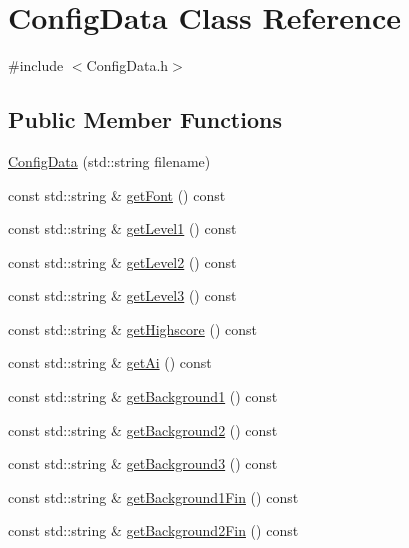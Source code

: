 \hypertarget{classConfigData}{}\section{Config\+Data Class Reference}
\label{classConfigData}


{\ttfamily \#include $<$Config\+Data.\+h$>$}

\subsection*{Public Member Functions}
\begin{DoxyCompactItemize}
\item 
\hyperlink{classConfigData_ab5aa8113ed01a5d906c11cc722a34bf1}{Config\+Data} (std\+::string filename)
\item 
const std\+::string \& \hyperlink{classConfigData_a2ebc3e9c59f5d799cc241c528a2a90b1}{get\+Font} () const
\item 
const std\+::string \& \hyperlink{classConfigData_a2e2c571c1dc23cc301a0dba85de97357}{get\+Level1} () const
\item 
const std\+::string \& \hyperlink{classConfigData_a073531011ba29efe96cb682801b778e7}{get\+Level2} () const
\item 
const std\+::string \& \hyperlink{classConfigData_a995d48538315ad108eed0cbd0eaaae69}{get\+Level3} () const
\item 
const std\+::string \& \hyperlink{classConfigData_a8b91e6a3dfe7cb880e9c5d43b6f0e00b}{get\+Highscore} () const
\item 
const std\+::string \& \hyperlink{classConfigData_a3c4ea1cdbbc1635fce4efec4b4aa1abd}{get\+Ai} () const
\item 
const std\+::string \& \hyperlink{classConfigData_a14b80899285714c7d72330fef05d643d}{get\+Background1} () const
\item 
const std\+::string \& \hyperlink{classConfigData_abaf686c98923cbd5b25d1135988499e7}{get\+Background2} () const
\item 
const std\+::string \& \hyperlink{classConfigData_a374fdf7f1d3275a86b08880133fa0e16}{get\+Background3} () const
\item 
const std\+::string \& \hyperlink{classConfigData_a73f750c44eee20c091b2a3984b42f5ec}{get\+Background1\+Fin} () const
\item 
const std\+::string \& \hyperlink{classConfigData_ab4a6bf95cb21298a472a17763d56c35d}{get\+Background2\+Fin} () const
\item 

\end{DoxyCompactItemize}
